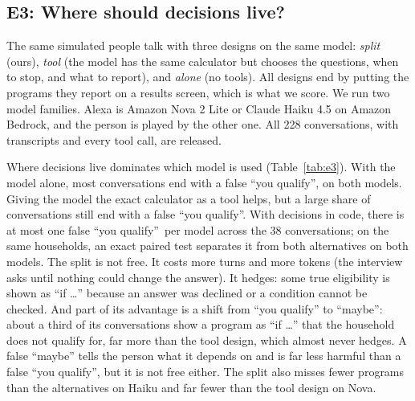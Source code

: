 \documentclass[11pt]{article}
\newcommand{\fq}{false ``you qualify''}
\begin{document}
\subsection{E3: Where should decisions live?}
The same simulated people talk with three designs on the same model: \emph{split} (ours), \emph{tool} (the model has the same calculator but chooses the questions, when to stop, and what to report), and \emph{alone} (no tools). All designs end by putting the programs they report on a results screen, which is what we score. We run two model families.
Alexa is Amazon Nova 2 Lite or Claude Haiku 4.5 on Amazon Bedrock, and the person is played by the other one. All 228 conversations, with transcripts and every tool call, are released.
\begin{table}[t]\centering\small
\resizebox{\linewidth}{!}{}
\caption{E3: the same 38 simulated people talking with each design. Scored on the results screen over every conversation; one that never reached results counts as missing every program the household qualifies for.}
\label{tab:e3}
\end{table}
Where decisions live dominates which model is used (Table~\ref{tab:e3}). With the model alone, most conversations end with a \fq, on both models. Giving the model the exact calculator as a tool helps, but a large share of conversations still end with a \fq. With decisions in code, there is at most one \fq\ per model across the 38 conversations; on the same households, an exact paired test separates it from both alternatives on both models. The split is not free. It costs more turns and more tokens (the interview asks until nothing could change the answer). It hedges: some true eligibility is shown as ``if \ldots'' because an answer was declined or a condition cannot be checked. And part of its advantage is a shift from ``you qualify'' to ``maybe'': about a third of its conversations show a program as ``if \ldots'' that the household does not qualify for, far more than the tool design, which almost never hedges. A false ``maybe'' tells the person what it depends on and is far less harmful than a false ``you qualify'', but it is not free either. The split also misses fewer programs than the alternatives on Haiku and far fewer than the tool design on Nova.
\end{document}
